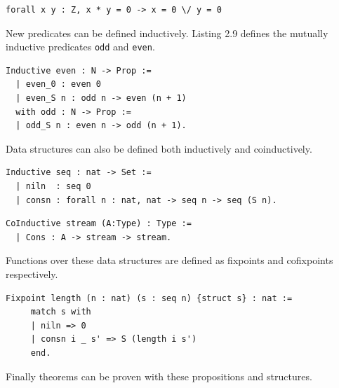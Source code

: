 \documentclass[12pt,twoside,notitlepage]{report}
\theoremstyle{plain}%
\theoremstyle{definition}
\theoremstyle{remark}
\begin{document}
\begin{lstlisting}[language={Coq},caption={Coq Prop predicate example},label={lst:coqpredex}]
forall x y : Z, x * y = 0 -> x = 0 \/ y = 0
\end{lstlisting}


New predicates can be defined inductively.  Listing 2.9 defines the mutually inductive predicates \lstinline[language={Coq}]|odd| and \lstinline[language={Coq}]|even|.


\begin{lstlisting}[language={Coq},caption={Coq Prop new predicate example}]
 Inductive even : N -> Prop :=
  | even_0 : even 0
  | even_S n : odd n -> even (n + 1)
  with odd : N -> Prop :=
  | odd_S n : even n -> odd (n + 1).
\end{lstlisting}


Data structures can also be defined both inductively and coinductively.


\begin{lstlisting}[language={Coq},caption={Coq inductive data structure example}]
 Inductive seq : nat -> Set :=
  | niln  : seq 0
  | consn : forall n : nat, nat -> seq n -> seq (S n).
\end{lstlisting}



\begin{lstlisting}[language={Coq},caption={Coq coinductive data structure example}]
 CoInductive stream (A:Type) : Type :=
  | Cons : A -> stream -> stream.
\end{lstlisting}


Functions over these data structures are defined as fixpoints and cofixpoints respectively.


\begin{lstlisting}[language={Coq},caption={Coq fixpoint example}]
 Fixpoint length (n : nat) (s : seq n) {struct s} : nat := 
     match s with
     | niln => 0
     | consn i _ s' => S (length i s')
     end.
\end{lstlisting}


Finally theorems can be proven with these propositions and structures.
\vspace{3mm}
\end{document}
